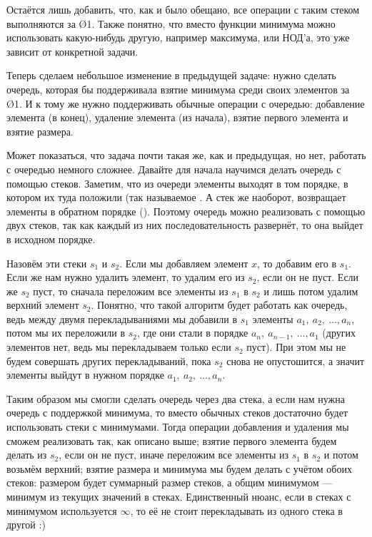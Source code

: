 
Остаётся лишь добавить, что, как и было обещано, все операции с таким стеком выполняются за \O{1}. Также понятно, что вместо функции минимума можно использовать какую-нибудь другую, например максимума, или НОД'а, это уже зависит от конкретной задачи.


Теперь сделаем небольшое изменение в предыдущей задаче: нужно сделать очередь, которая бы поддерживала взятие минимума среди своих элементов за \O{1}. И к тому же нужно поддерживать обычные операции с очередью: добавление элемента (в конец), удаление элемента (из начала), взятие первого элемента и взятие размера. 

Может показаться, что задача почти такая же, как и предыдущая, но нет, работать с очередью немного сложнее. Давайте для начала научимся делать очередь с помощью стеков. Заметим, что из очереди элементы выходят в том порядке, в котором их туда положили (так называемое . А стек же наоборот, возвращает элементы в обратном порядке (). Поэтому очередь можно реализовать с помощью двух стеков, так как каждый из них последовательность развернёт, то она выйдет в исходном порядке.

Назовём эти стеки $s_1$ и $s_2$. Если мы добавляем элемент $x$, то добавим его в $s_1$. Если же нам нужно удалить элемент, то удалим его из $s_2$, если он не пуст. Если же $s_2$ пуст, то сначала переложим все элементы из $s_1$ в $s_2$ и лишь потом удалим верхний элемент $s_2$. Понятно, что такой алгоритм будет работать как очередь, ведь между двумя перекладываниями мы добавили в $s_1$ элементы $a_1,\ a_2,\ \ldots, a_n$, потом мы их переложили в $s_2$, где они стали в порядке $a_n,\ a_{n - 1},\ \ldots, a_1$ (других элементов нет, ведь мы перекладываем только если $s_2$ пуст). При этом мы не будем совершать других перекладываний, пока $s_2$ снова не опустошится, а значит элементы выйдут в нужном порядке $a_1,\ a_2,\ \ldots, a_n$.

Таким образом мы смогли сделать очередь через два стека, а если нам нужна очередь с поддержкой минимума, то вместо обычных стеков достаточно будет использовать стеки с минимумами. Тогда операции добавления и удаления мы сможем реализовать так, как описано выше; взятие первого элемента будем делать из $s_2$, если он не пуст, иначе переложим все элементы из $s_1$ в $s_2$ и потом возьмём верхний; взятие размера и минимума мы будем делать с учётом обоих стеков: размером будет суммарный размер стеков, а общим минимумом — минимум из текущих значений в стеках. Единственный нюанс, если в стеках с минимумом используется $\infty$, то её не стоит перекладывать из одного стека в другой :)

